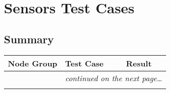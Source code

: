 
\section{Sensors Test Cases}
\subsection{Summary}
\resetTestCase

\begin{center}
\setlongtables
\begin{longtable}{|l|l|l|}
\hline
\textbf{Node Group} & \textbf{Test Case} & \textbf{Result} \\
\hline\hline
\endhead
 & \multicolumn{2}{|r|}{\textsl{continued on the next page\ldots}} \\
\hline
\endfoot
\hline
\endlastfoot
& & \\
\cline{2-3}
\end{longtable}
\end{center}
